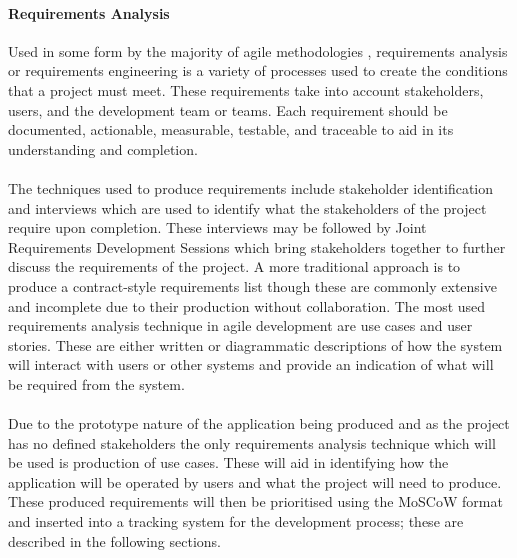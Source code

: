 		\paragraph{Requirements Analysis}
			Used in some form by the majority of agile methodologies , requirements analysis or requirements engineering is a variety of processes used to create the conditions that a project must meet. These requirements take into account stakeholders, users, and the development team or teams. Each requirement should be documented, actionable, measurable, testable, and traceable to aid in its understanding and completion.
			\\\\
			The techniques used to produce requirements include stakeholder identification and interviews which are used to identify what the stakeholders of the project require upon completion. These interviews may be followed by Joint Requirements Development Sessions which bring stakeholders together to further discuss the requirements of the project. A more traditional approach is to produce a contract-style requirements list though these are commonly extensive and incomplete due to their production without collaboration. The most used requirements analysis technique in agile development are use cases and user stories. These are either written or diagrammatic descriptions of how the system will interact with users or other systems and provide an indication of what will be required from the system.
			\\\\
			Due to the prototype nature of the application being produced and as the project has no defined stakeholders the only requirements analysis technique which will be used is production of use cases. These will aid in identifying how the application will be operated by users and what the project will need to produce. These produced requirements will then be prioritised using the MoSCoW format and inserted into a tracking system for the development process; these are described in the following sections.
